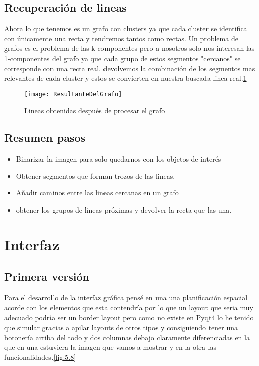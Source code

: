\subsection{Recuperación de lineas}
Ahora lo que tenemos es un grafo con clusters ya que cada cluster se identifica con únicamente una recta y tendremos tantos como rectas.
Un problema de grafos es el problema de las k-componentes pero a nosotros solo nos interesan las 1-componentes del grafo ya que cada grupo de estos segmentos "cercanos" se corresponde con una recta real.
devolvemos la combinación de los segmentos mas relevantes de cada cluster y estos se convierten en nuestra buscada linea real.\ref{fig:5.7}
\begin{figure}[h]
\centering
\texttt{[image: ResultanteDelGrafo]}
\caption{Lineas obtenidas después de procesar el grafo}
\label{fig:5.7}
\end{figure}

\subsection{Resumen pasos}

\begin{itemize}
\item Binarizar la imagen para solo quedarnos con los objetos de interés
\item Obtener segmentos que forman trozos de las lineas.
\item Añadir caminos entre las lineas cercanas en un grafo
\item obtener los grupos de lineas próximas y devolver la recta que las una. 
\end{itemize}

\section{Interfaz}
\subsection{Primera versión}

Para el desarrollo de la interfaz gráfica pensé en una una planificación espacial acorde con los elementos que esta contendría por lo que un layout que seria muy adecuado podría ser un border layout pero como no existe en Pyqt4 lo he tenido que simular gracias a apilar layouts de otros tipos y consiguiendo tener una botonería arriba del todo y dos columnas debajo claramente diferenciadas en la que en una estuviera la imagen que vamos a mostrar y en la otra las funcionalidades.\ref{fig:5.8}

